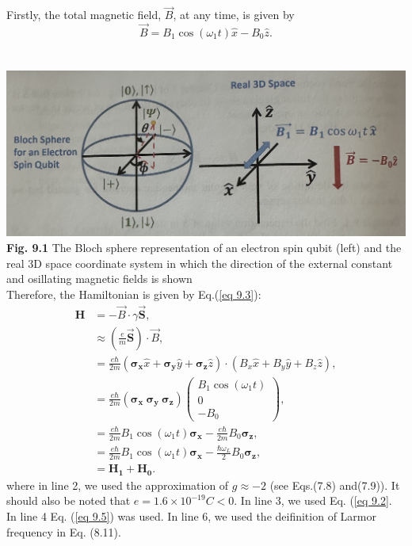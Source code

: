 \documentclass{article}
\begin{document}
Firstly, the total magnetic field, $\vec{B}$, at any time, is given by
\begin{equation}\label{eq 9.5}
    \vec{B}=B_1\cos(\omega_1t)\hat{x}-B_0\hat{z}.\tag{9.5}
\end{equation}
\\\\
\includegraphics[scale=0.5]{Fig.9.1.jpeg}\\
\textbf{Fig. 9.1} The Bloch sphere representation of an electron spin qubit (left) and the real 3D space 
coordinate system in which the direction of the external constant and osillating magnetic fields
is shown\\

Therefore, the Hamiltonian is given by Eq.(\ref{eq 9.3}):
\begin{align*}\label{eq 9.6}
    \boldsymbol{H}&=-\vec{B}\cdot\gamma\vec{\boldsymbol{S}},\\
    &\approx\left(\frac{e}{m}\vec{\boldsymbol{S}}\right)\cdot\vec{B},\\
    &=\frac{e\hbar}{2m}(\boldsymbol{\sigma_x}\hat{x}+\boldsymbol{\sigma_y}\hat{y}+\boldsymbol{\sigma_z}\hat{z})\cdot
    (B_x\hat{x}+B_y\hat{y}+B_z\hat{z}),\\
    &=\frac{e\hbar}{2m}(\boldsymbol{\sigma_x}\ \boldsymbol{\sigma_y}\ \boldsymbol{\sigma_z})\begin{pmatrix}
        B_1\cos(\omega_1t)\\
        0\\
        -B_0
    \end{pmatrix},\\
    &=\frac{e\hbar}{2m}B_1\cos(\omega_1t)\boldsymbol{\sigma_x}-\frac{e\hbar}{2m}B_0\boldsymbol{\sigma_z},\\
    &=\frac{e\hbar}{2m}B_1\cos(\omega_1t)\boldsymbol{\sigma_x}-\frac{\hbar\omega_L}{2}B_0\boldsymbol{\sigma_z},\\
    &=\boldsymbol{H_1}+\boldsymbol{H_0}. \tag{9.6}
\end{align*}
where in line 2, we used the approximation of $g\approx-2$ (see Eqs.(7.8) and(7.9)). It should also
be noted that $e=1.6\times10^{-19}C<0$. In line 3, we used Eq. (\ref{eq 9.2}. In line 4
Eq. (\ref{eq 9.5}) was used. In line 6, we used the deifinition of Larmor frequency in Eq. (8.11).
\end{document}

